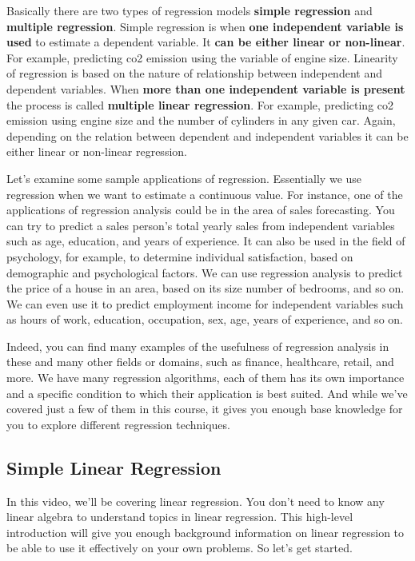 	Basically there are two types of regression models \textbf{simple regression} and \textbf{multiple regression}. Simple regression is when \textbf{one independent variable is used} to estimate a dependent variable. It \textbf{can be either linear or non-linear}. 
	For example, predicting co2 emission using the variable of engine size. 
	Linearity of regression is based on the nature of relationship between independent and dependent variables. When \textbf{more than one independent variable is present} the process is called \textbf{multiple linear regression}. For example, predicting co2 emission using engine size and the number of cylinders in any given car. Again, depending on the relation between dependent and independent variables it can be either linear or non-linear regression. 
	
	Let's examine some sample applications of regression. 
	Essentially we use regression when we want to estimate a continuous value. For instance, one of the applications of regression analysis could be in the area of sales forecasting. You can try to predict a sales person's total yearly sales from independent variables such as age, education, and years of experience. 
	It can also be used in the field of psychology, for example, to determine individual satisfaction, based on demographic and psychological factors. We can use regression analysis to predict the price of a house in an area, based on its size number of bedrooms, and so on. We can even use it to predict employment income for independent variables such as hours of work, education, occupation, sex, age, years of experience, and so on. 
	
	Indeed, you can find many examples of the usefulness of regression analysis in these and many other fields or domains, such as finance, healthcare, retail, and more. We have many regression algorithms, each of them has its own importance and a specific condition to which their application is best suited. And while we've covered just a few of them in this course, it gives you enough base knowledge for you to explore different regression techniques. 
	
	\subsection{Simple Linear Regression}
	
	
	In this video, we'll be covering linear regression. You don't need to know any linear algebra to understand topics in linear regression. This high-level introduction will give you enough background information on linear regression to be able to use it effectively on your own problems. So let's get started.
	

